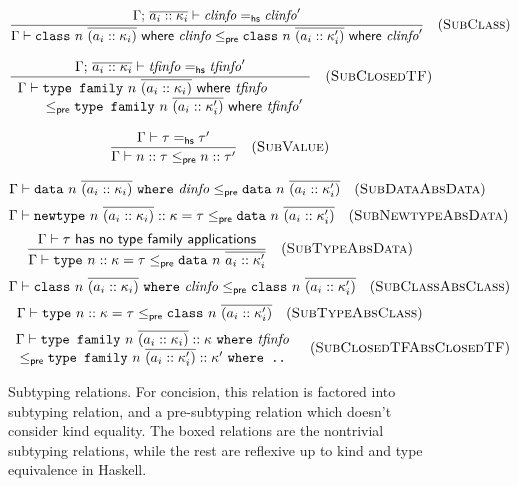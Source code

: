\begin{figure}
\[
\frac{
\Gamma;\, \overline{a_i :: \kappa_i} \vdash \mathit{clinfo} =_\textsf{hs} \mathit{clinfo}'
}{
\Gamma \vdash \texttt{class}~n~\overline{(a_i :: \kappa_i)} ~\textsf{where}~ \mathit{clinfo} \le_\textsf{pre} \texttt{class}~n~\overline{(a_i :: \kappa'_i)} ~\textsf{where}~ \mathit{clinfo}'
}
\quad(\textsc{SubClass})
\]

\[
\frac{
\Gamma;\, \overline{a_i :: \kappa_i} \vdash \mathit{tfinfo} =_\textsf{hs} \mathit{tfinfo}'
}{
\begin{array}{l}
\Gamma \vdash \texttt{type family}~n~\overline{(a_i :: \kappa_i)} ~\textsf{where}~ \mathit{tfinfo}
\\ \qquad \le_\textsf{pre} \texttt{type family}~n~\overline{(a_i :: \kappa'_i)} ~\textsf{where}~ \mathit{tfinfo}'
\end{array}
}
\quad(\textsc{SubClosedTF})
\]

\[
\frac{
\Gamma \vdash \tau =_\textsf{hs} \tau'
}{
\Gamma \vdash n :: \tau \le_\textsf{pre} n :: \tau'
}
\quad(\textsc{SubValue})
\]


\begin{mdframed}
\[
\Gamma \vdash \texttt{data}~n~\overline{(a_i :: \kappa_i)} ~\texttt{where}~ \mathit{dinfo} \le_\textsf{pre} \texttt{data}~n~\overline{(a_i :: \kappa'_i)}
\quad(\textsc{SubDataAbsData})
\]
\[
\Gamma \vdash \texttt{newtype}~n~\overline{(a_i :: \kappa_i)} :: \kappa = \tau \le_\textsf{pre} \texttt{data}~n~\overline{(a_i :: \kappa'_i)}
\quad(\textsc{SubNewtypeAbsData})
\]
\[
\frac{
\Gamma \vdash \tau ~\textsf{has no type family applications}
}{
\Gamma \vdash \texttt{type}~n :: \kappa = \tau \le_\textsf{pre} \texttt{data}~n~\overline{a_i :: \kappa'_i}
}
\quad(\textsc{SubTypeAbsData})
\]
\[
\Gamma \vdash \texttt{class}~n~\overline{(a_i :: \kappa_i)}~\texttt{where}~ \mathit{clinfo} \le_\textsf{pre} \texttt{class}~n~\overline{(a_i :: \kappa'_i)}
\quad(\textsc{SubClassAbsClass})
\]
\[
\Gamma \vdash \texttt{type}~n :: \kappa = \tau \le_\textsf{pre} \texttt{class}~n~\overline{(a_i :: \kappa'_i)}
\quad(\textsc{SubTypeAbsClass})
\]
\[
\begin{array}{c}
\Gamma \vdash \texttt{type family}~n~\overline{(a_i :: \kappa_i)} :: \kappa ~\texttt{where}~ \mathit{tfinfo} \\
\le_\textsf{pre} \texttt{type family}~n~\overline{(a_i :: \kappa'_i)} :: \kappa' ~\texttt{where ..}
\end{array}
\quad(\textsc{SubClosedTFAbsClosedTF})
\]
\end{mdframed}
\caption{Subtyping relations.  For concision, this relation is factored into
subtyping relation, and a pre-subtyping relation which doesn't consider kind
equality.  The boxed relations are the nontrivial subtyping relations, while
the rest are reflexive up to kind and type equivalence in Haskell.}
\end{figure}
